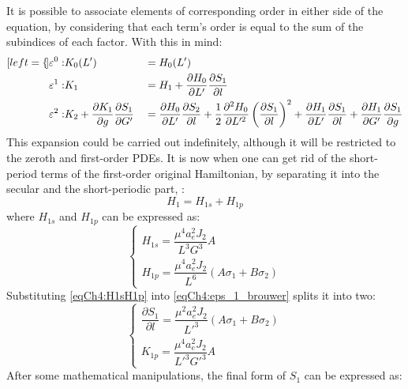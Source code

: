 		\indent It is possible to associate elements of corresponding order in either side of the equation, by considering that each term's order is equal to the sum of the subindices of each factor.  With this in mind:
		\begin{alignat}{4}[left = \empheqlbrace]
		\label{eqCh4:eps_0_brouwer}\varepsilon^0 : & K_0(L') && =  H_0(L')  \\
		\label{eqCh4:eps_1_brouwer}\varepsilon^1 : & K_1 && =  H_1 + \dfrac{\partial H_0}{\partial L'} \dfrac{\partial S_1}{\partial l} \\
		\label{eqCh4:eps_2_brouwer}\varepsilon^2 : 	& K_2 + \dfrac{\partial K_1}{ \partial g} \dfrac{\partial S_1}{\partial G'} &&=  \dfrac{\partial H_0}{\partial L'} \dfrac{\partial S_2}{\partial l} +  \dfrac{1}{2} \dfrac{\partial^2 H_0}{\partial L'^2} \left( \dfrac{\partial S_1}{\partial l} \right)^2 + \dfrac{\partial H_1}{\partial L'} \dfrac{\partial S_1}{\partial l} + \dfrac{\partial H_1}{\partial G'}\dfrac{\partial S_1}{\partial g}
		\end{alignat}
		\indent This expansion could be carried out indefinitely, although it will be restricted to the zeroth and first-order PDEs. It is now when one can get rid of the short-period terms of the first-order original Hamiltonian, by separating it into the secular and the short-periodic part, \ie :
		\[
		H_1 = H_{1s} + H_{1p}
		\]
		\indent where $H_{1s}$ and $H_{1p}$ can be expressed as:
		\begin{equation}	
		\left\{
		\begin{array}{ll}
		H_{1s} = \dfrac{\mu^4 a_e^2 J_2}{L^3 G^3} A \\[1.2em]
		H_{1p} = \dfrac{\mu^4 a_e^2 J_2}{L^6} \left( A\sigma_1 + B \sigma_2 \right)
		\end{array}\right.
		\label{eqCh4:H1sH1p}
		\end{equation}
		\indent Substituting \eqref{eqCh4:H1sH1p} into \eqref{eqCh4:eps_1_brouwer} splits it into two:
		\begin{equation}
		\left\{
		\begin{array}{ll}
		\dfrac{\partial S_1}{\partial l}= \dfrac{\mu^2 a_e^2 J_2}{L'^3} \left( A\sigma_1 + B \sigma_2 \right) \\[1.2em]
		K_{1p} = \dfrac{\mu^4 a_e^2 J_2}{L'^3 G'^3} A
		\end{array}\right.
		\label{eqCh4:H1sH1p_2}
		\end{equation}
		\indent After some mathematical manipulations, the final form of $S_1$ can be expressed as:
